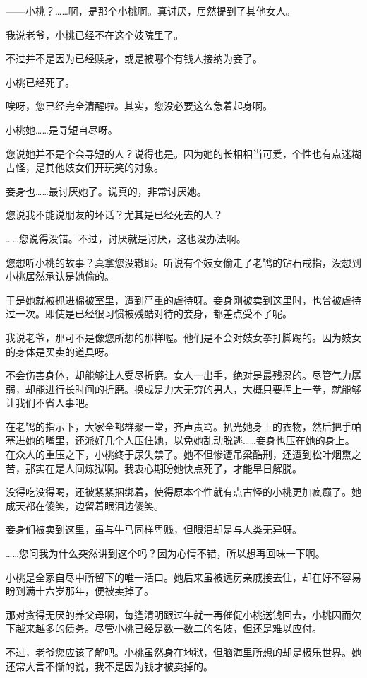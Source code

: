 \documentclass[portrait,a4paper]{article}
\begin{document}
——小桃？……啊，是那个小桃啊。真讨厌，居然提到了其他女人。

我说老爷，小桃已经不在这个妓院里了。

不过并不是因为已经赎身，或是被哪个有钱人接纳为妾了。

小桃已经死了。

唉呀，您已经完全清醒啦。其实，您没必要这么急着起身啊。

小桃她……是寻短自尽呀。

您说她并不是个会寻短的人？说得也是。因为她的长相相当可爱，个性也有点迷糊古怪，是其他妓女们开玩笑的对象。

妾身也……最讨厌她了。说真的，非常讨厌她。

您说我不能说朋友的坏话？尤其是已经死去的人？

……您说得没错。不过，讨厌就是讨厌，这也没办法啊。

您想听小桃的故事？真拿您没辙耶。听说有个妓女偷走了老鸨的钻石戒指，没想到小桃居然承认是她偷的。

于是她就被抓进棉被室里，遭到严重的虐待呀。妾身刚被卖到这里时，也曾被虐待过一次。即使是已经很习惯被残酷对待的妾身，都差点受不了呢。

我说老爷，那可不是像您所想的那样喔。他们是不会对妓女拳打脚踢的。因为妓女的身体是买卖的道具呀。

不会伤害身体，却能够让人受尽折磨。女人一出手，绝对是最残忍的。尽管气力孱弱，却能进行长时间的折磨。换成是力大无穷的男人，大概只要挥上一拳，就能够让我们不省人事吧。

在老鸨的指示下，大家全都群聚一堂，齐声责骂。扒光她身上的衣物，然后把手帕塞进她的嘴里，还派好几个人压住她，以免她乱动脱逃……妾身也压在她的身上。在众人的重压之下，小桃终于尿失禁了。她不但惨遭吊梁酷刑，还遭到松叶烟熏之苦，那实在是人间炼狱啊。我衷心期盼她快点死了，才能早日解脱。

没得吃没得喝，还被紧紧捆绑着，使得原本个性就有点古怪的小桃更加疯癫了。她成天都在傻笑，边留着眼泪边傻笑。

妾身们被卖到这里，虽与牛马同样卑贱，但眼泪却是与人类无异呀。

……您问我为什么突然讲到这个吗？因为心情不错，所以想再回味一下啊。

小桃是全家自尽中所留下的唯一活口。她后来虽被远房亲戚接去住，却在好不容易盼到满十六岁那年，便被卖掉了。

那对贪得无厌的养父母啊，每逢清明跟过年就一再催促小桃送钱回去，小桃因而欠下越来越多的债务。尽管小桃已经是数一数二的名妓，但还是难以应付。

不过，老爷您应该了解吧。小桃虽然身在地狱，但脑海里所想的却是极乐世界。她还常大言不惭的说，我不是因为钱才被卖掉的。
\end{document}
